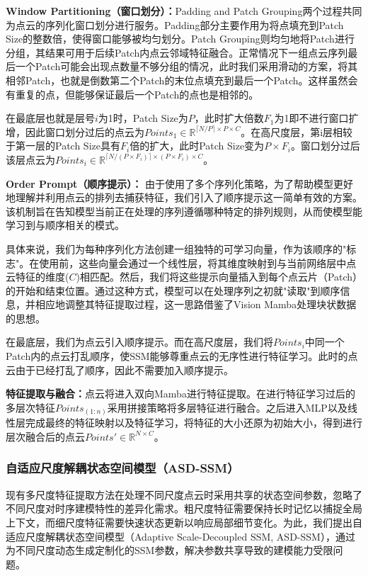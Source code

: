 \documentclass[preprint,12pt]{elsarticle}
\begin{document}
\textbf{Window Partitioning（窗口划分）：}Padding and Patch Grouping两个过程共同为点云的序列化窗口划分进行服务。Padding部分主要作用为将点填充到Patch Size的整数倍，使得窗口能够被均匀划分。Patch Grouping则均匀地将Patch进行分组，其结果可用于后续Patch内点云邻域特征融合。正常情况下一组点云序列最后一个Patch可能会出现点数量不够分组的情况，此时我们采用滑动的方案，将其相邻Patch，也就是倒数第二个Patch的末位点填充到最后一个Patch。这样虽然会有重复的点，但能够保证最后一个Patch的点也是相邻的。

在最底层也就是层号$i$为1时，Patch Size为$P$，此时扩大倍数$F_1$为1即不进行窗口扩增，因此窗口划分过后的点云为$Points_{1}\in\mathbb{R}^{\lceil N/P \rceil\times P \times C}$。在高尺度层，第i层相较于第一层的Patch Size具有$F_{i}$倍的扩大，此时Patch Size变为$P\times F_{i}$。窗口划分过后该层点云为$Points_{i}\in\mathbb{R}^{\lceil N/(P\times F_{i}) \rceil\times (P\times F_{i}) \times C}$。

\textbf{Order Prompt（顺序提示）：}
由于使用了多个序列化策略，为了帮助模型更好地理解并利用点云的排列去捕获特征，我们引入了顺序提示这一简单有效的方案。该机制旨在告知模型当前正在处理的序列遵循哪种特定的排列规则，从而使模型能学习到与顺序相关的模式。

具体来说，我们为每种序列化方法创建一组独特的可学习向量，作为该顺序的"标志"。在使用前，这些向量会通过一个线性层，将其维度映射到与当前网络层中点云特征的维度($C$)相匹配。然后，我们将这些提示向量插入到每个点云片（Patch）的开始和结束位置。通过这种方式，模型可以在处理序列之初就"读取"到顺序信息，并相应地调整其特征提取过程，这一思路借鉴了Vision Mamba\cite{VisionMamba}处理块状数据的思想。

在最底层，我们为点云引入顺序提示。而在高尺度层，我们将$Points_{i}$中同一个Patch内的点云打乱顺序，使SSM能够尊重点云的无序性进行特征学习。此时的点云由于已经打乱了顺序，因此不需要加入顺序提示。

\textbf{特征提取与融合：}点云将进入双向Mamba进行特征提取。在进行特征学习过后的多层次特征$Points_{(1:n)}$采用拼接策略将多层特征进行融合。之后进入MLP以及线性层完成最终的特征映射以及特征学习，将特征的大小还原为初始大小，得到进行层次融合后的点云$Points'\in\mathbb{R}^{N\times{C}}$。

\subsubsection{自适应尺度解耦状态空间模型（ASD-SSM）}
现有多尺度特征提取方法在处理不同尺度点云时采用共享的状态空间参数，忽略了不同尺度对时序建模特性的差异化需求。粗尺度特征需要保持长时记忆以捕捉全局上下文，而细尺度特征需要快速状态更新以响应局部细节变化。为此，我们提出自适应尺度解耦状态空间模型（Adaptive Scale-Decoupled SSM, ASD-SSM），通过为不同尺度动态生成定制化的SSM参数，解决参数共享导致的建模能力受限问题。
\end{document}
